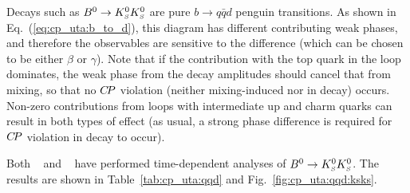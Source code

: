 Decays such as $B^0\to K^0_{\scriptscriptstyle S}K^0_{\scriptscriptstyle S}$ are pure $b \to q\bar{q}d$ penguin transitions.
As shown in Eq.~(\ref{eq:cp_uta:b_to_d}),
this diagram has different contributing weak phases,
and therefore the observables are sensitive to the difference 
(which can be chosen to be either $\beta$ or $\gamma$).
Note that if the contribution with the top quark in the loop dominates,
the weak phase from the decay amplitudes should cancel that from mixing,
so that no $C\!P$ violation (neither mixing-induced nor in decay) occurs.
Non-zero contributions from loops with intermediate up and charm quarks
can result in both types of effect 
(as usual, a strong phase difference is required for $C\!P$ violation in decay
to occur).

Both \babar~\cite{Aubert:2006gm} and \belle~\cite{Nakahama:2007dg}
have performed time-dependent analyses of $B^0\to K^0_{\scriptscriptstyle S}K^0_{\scriptscriptstyle S}$.
The results are shown in Table~\ref{tab:cp_uta:qqd}
and Fig.~\ref{fig:cp_uta:qqd:ksks}.



